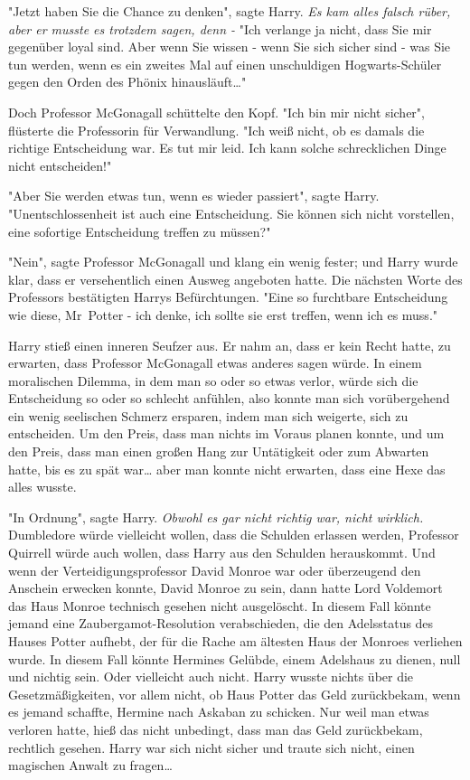 {"Jetzt haben Sie die Chance zu denken", sagte Harry. \emph{Es kam alles falsch rüber, aber er musste es trotzdem sagen, denn -} "Ich verlange ja nicht, dass Sie mir gegenüber loyal sind. Aber wenn Sie wissen - wenn Sie sich sicher sind - was Sie tun werden, wenn es ein zweites Mal auf einen unschuldigen Hogwarts-Schüler gegen den Orden des Phönix hinausläuft…"

Doch Professor McGonagall schüttelte den Kopf. "Ich bin mir nicht sicher", flüsterte die Professorin für Verwandlung. "Ich weiß nicht, ob es damals die richtige Entscheidung war. Es tut mir leid. Ich kann solche schrecklichen Dinge nicht entscheiden!"

"Aber Sie werden etwas tun, wenn es wieder passiert", sagte Harry. "Unentschlossenheit ist auch eine Entscheidung. Sie können sich nicht vorstellen, eine sofortige Entscheidung treffen zu müssen?"

"Nein", sagte Professor McGonagall und klang ein wenig fester; und Harry wurde klar, dass er versehentlich einen Ausweg angeboten hatte. Die nächsten Worte des Professors bestätigten Harrys Befürchtungen. "Eine so furchtbare Entscheidung wie diese, Mr~Potter - ich denke, ich sollte sie erst treffen, wenn ich es muss."

Harry stieß einen inneren Seufzer aus. Er nahm an, dass er kein Recht hatte, zu erwarten, dass Professor McGonagall etwas anderes sagen würde. In einem moralischen Dilemma, in dem man so oder so etwas verlor, würde sich die Entscheidung so oder so schlecht anfühlen, also konnte man sich vorübergehend ein wenig seelischen Schmerz ersparen, indem man sich weigerte, sich zu entscheiden. Um den Preis, dass man nichts im Voraus planen konnte, und um den Preis, dass man einen großen Hang zur Untätigkeit oder zum Abwarten hatte, bis es zu spät war… aber man konnte nicht erwarten, dass eine Hexe das alles wusste.

"In Ordnung", sagte Harry. \emph{Obwohl es gar nicht richtig war, nicht wirklich.} Dumbledore würde vielleicht wollen, dass die Schulden erlassen werden, Professor Quirrell würde auch wollen, dass Harry aus den Schulden herauskommt. Und wenn der Verteidigungsprofessor David Monroe war oder überzeugend den Anschein erwecken konnte, David Monroe zu sein, dann hatte Lord Voldemort das Haus Monroe technisch gesehen nicht ausgelöscht. In diesem Fall könnte jemand eine Zaubergamot-Resolution verabschieden, die den Adelsstatus des Hauses Potter aufhebt, der für die Rache am ältesten Haus der Monroes verliehen wurde. In diesem Fall könnte Hermines Gelübde, einem Adelshaus zu dienen, null und nichtig sein. Oder vielleicht auch nicht. Harry wusste nichts über die Gesetzmäßigkeiten, vor allem nicht, ob Haus Potter das Geld zurückbekam, wenn es jemand schaffte, Hermine nach Askaban zu schicken. Nur weil man etwas verloren hatte, hieß das nicht unbedingt, dass man das Geld zurückbekam, rechtlich gesehen. Harry war sich nicht sicher und traute sich nicht, einen magischen Anwalt zu fragen…

}
